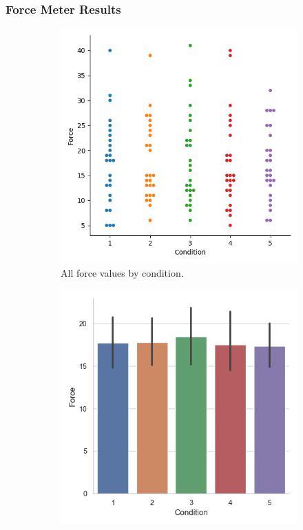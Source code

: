 \subsubsection{Force Meter Results}
\begin{figure}[H]
\hspace*{\fill}
     \begin{subfigure}[b]{0.4\textwidth}
         \centering
         \vspace*{-10mm}
         \includegraphics[width=\textwidth]{Files/Plots/force_by_cond_swarm.png}
         \caption{All force values by condition.}
         \label{fig:allForceSwarm}
     \end{subfigure}
     \hspace*{\fill}
     \begin{subfigure}[b]{0.4\textwidth}
         \centering
         \includegraphics[width=\textwidth]{Files/Plots/force_mean_by_condition.png}

\end{subfigure}
\end{figure}
